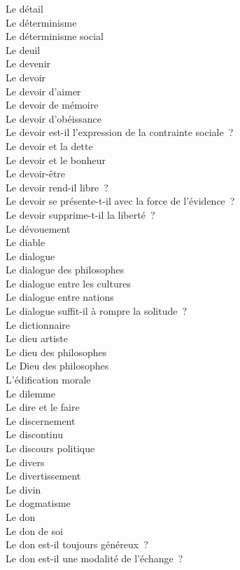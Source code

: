 \documentclass[a4paper,12pt]{article}
\begin{document}
Le détail \\
Le déterminisme \\
Le déterminisme social \\
Le deuil \\
Le devenir \\
Le devoir \\
Le devoir d'aimer \\
Le devoir de mémoire \\
Le devoir d'obéissance \\
Le devoir est-il l'expression de la contrainte sociale ? \\
Le devoir et la dette \\
Le devoir et le bonheur \\
Le devoir-être \\
Le devoir rend-il libre ? \\
Le devoir se présente-t-il avec la force de l'évidence ? \\
Le devoir supprime-t-il la liberté ? \\
Le dévouement \\
Le diable \\
Le dialogue \\
Le dialogue des philosophes \\
Le dialogue entre les cultures \\
Le dialogue entre nations \\
Le dialogue suffit-il à rompre la solitude ? \\
Le dictionnaire \\
Le dieu artiste \\
Le dieu des philosophes \\
Le Dieu des philosophes \\
L'édification morale \\
Le dilemme \\
Le dire et le faire \\
Le discernement \\
Le discontinu \\
Le discours politique \\
Le divers \\
Le divertissement \\
Le divin \\
Le dogmatisme \\
Le don \\
Le don de soi \\
Le don est-il toujours généreux ? \\
Le don est-il une modalité de l'échange ? \\
\end{document}
